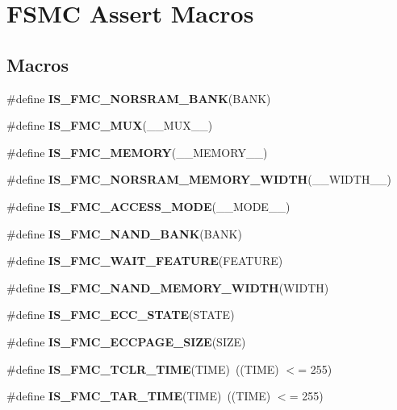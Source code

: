 \hypertarget{group___f_s_m_c___l_l___assert___macros}{}\section{F\+S\+MC Assert Macros}
\label{group___f_s_m_c___l_l___assert___macros}
\subsection*{Macros}
\begin{DoxyCompactItemize}
\item 
\#define {\bfseries I\+S\+\_\+\+F\+M\+C\+\_\+\+N\+O\+R\+S\+R\+A\+M\+\_\+\+B\+A\+NK}(B\+A\+NK)
\item 
\#define {\bfseries I\+S\+\_\+\+F\+M\+C\+\_\+\+M\+UX}(\+\_\+\+\_\+\+M\+U\+X\+\_\+\+\_\+)
\item 
\#define {\bfseries I\+S\+\_\+\+F\+M\+C\+\_\+\+M\+E\+M\+O\+RY}(\+\_\+\+\_\+\+M\+E\+M\+O\+R\+Y\+\_\+\+\_\+)
\item 
\#define {\bfseries I\+S\+\_\+\+F\+M\+C\+\_\+\+N\+O\+R\+S\+R\+A\+M\+\_\+\+M\+E\+M\+O\+R\+Y\+\_\+\+W\+I\+D\+TH}(\+\_\+\+\_\+\+W\+I\+D\+T\+H\+\_\+\+\_\+)
\item 
\#define {\bfseries I\+S\+\_\+\+F\+M\+C\+\_\+\+A\+C\+C\+E\+S\+S\+\_\+\+M\+O\+DE}(\+\_\+\+\_\+\+M\+O\+D\+E\+\_\+\+\_\+)
\item 
\#define {\bfseries I\+S\+\_\+\+F\+M\+C\+\_\+\+N\+A\+N\+D\+\_\+\+B\+A\+NK}(B\+A\+NK)
\item 
\#define {\bfseries I\+S\+\_\+\+F\+M\+C\+\_\+\+W\+A\+I\+T\+\_\+\+F\+E\+A\+T\+U\+RE}(F\+E\+A\+T\+U\+RE)
\item 
\#define {\bfseries I\+S\+\_\+\+F\+M\+C\+\_\+\+N\+A\+N\+D\+\_\+\+M\+E\+M\+O\+R\+Y\+\_\+\+W\+I\+D\+TH}(W\+I\+D\+TH)
\item 
\#define {\bfseries I\+S\+\_\+\+F\+M\+C\+\_\+\+E\+C\+C\+\_\+\+S\+T\+A\+TE}(S\+T\+A\+TE)
\item 
\#define {\bfseries I\+S\+\_\+\+F\+M\+C\+\_\+\+E\+C\+C\+P\+A\+G\+E\+\_\+\+S\+I\+ZE}(S\+I\+ZE)
\item 
\#define {\bfseries I\+S\+\_\+\+F\+M\+C\+\_\+\+T\+C\+L\+R\+\_\+\+T\+I\+ME}(T\+I\+ME)~((T\+I\+ME) $<$= 255)\hypertarget{group___f_s_m_c___l_l___assert___macros_ga8a84c334fc3ec89633c7af9894288bd5}{}\label{group___f_s_m_c___l_l___assert___macros_ga8a84c334fc3ec89633c7af9894288bd5}

\item 
\#define {\bfseries I\+S\+\_\+\+F\+M\+C\+\_\+\+T\+A\+R\+\_\+\+T\+I\+ME}(T\+I\+ME)~((T\+I\+ME) $<$= 255)\hypertarget{group___f_s_m_c___l_l___assert___macros_ga5be8596326765d66d164f6d66694ed6a}{}\label{group___f_s_m_c___l_l___assert___macros_ga5be8596326765d66d164f6d66694ed6a}


\end{DoxyCompactItemize}
